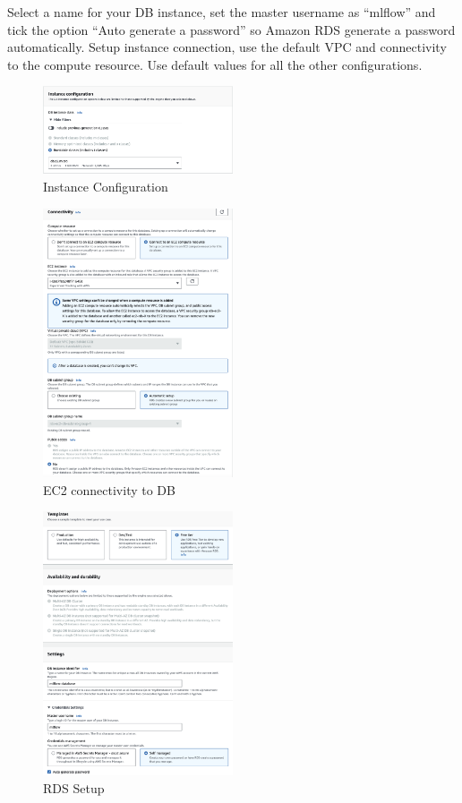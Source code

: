 \documentclass[letterpaper,12pt,notitlepage,twoside]{report}
\begin{document}
\begin{itemize}
Select a name for your DB instance, set the master username as ``mlflow'' and tick the option ``Auto generate a password'' so Amazon RDS generate a password automatically.  Setup instance connection, use the default VPC and connectivity to the compute resource. Use default values for all the other configurations.

\begin{figure}[h]
	\centering
	\includegraphics[width=0.5\textwidth]{Images/instance-configuration.png}
	\caption{Instance Configuration}
	\label{fig:13}
\end{figure}
\FloatBarrier

\begin{figure}[h]
	\centering
	\includegraphics[width=0.5\textwidth]{Images/EC2 connectivity to DB.png}
	\caption{EC2 connectivity to DB}
	\label{fig:14}
\end{figure}
\FloatBarrier

\begin{figure}[h]
	\centering
	\includegraphics[width=0.5\textwidth]{Images/RDS-setup.png}
	\caption{RDS Setup}
	\label{fig:15}
\end{figure}
\FloatBarrier


\end{itemize}
\end{document}
